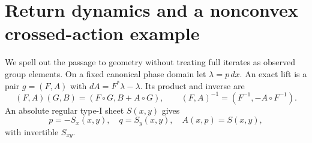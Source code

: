 \section{Return dynamics and a nonconvex crossed-action example}
\label{sec:v82-geometry}

We spell out the passage to geometry without treating full iterates as
observed group elements. On a fixed canonical phase domain let
$\lambda=p\,dx$. An exact lift is a pair $g=(F,A)$ with
$dA=F^*\lambda-\lambda$. Its product and inverse are
\begin{equation}\label{eq:v82-lift}
 (F,A)(G,B)=(F\circ G,B+A\circ G),\qquad
 (F,A)^{-1}=(F^{-1},-A\circ F^{-1}).
\end{equation}
An absolute regular type-I sheet $S(x,y)$ gives
\begin{equation}\label{eq:v82-graph}
                 p=-S_x(x,y),\quad q=S_y(x,y),\quad A(x,p)=S(x,y),
\end{equation}
with invertible $S_{xy}$.

